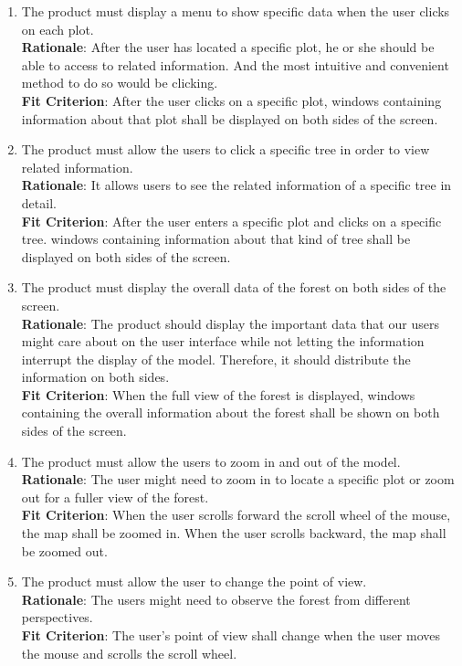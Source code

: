 \documentclass{article}
\begin{document}
\begin{enumerate}[FR1]
	\item The product must display a menu to show specific data when the user clicks on each plot.\\
	\textbf{Rationale}: After the user has located a specific plot, he or she should be able to access to related information. And the most intuitive and convenient method to do so would be clicking. \\
	\textbf{Fit Criterion}: After the user clicks on a specific plot, windows containing information about that plot shall be displayed on both sides of the screen.
	
	\item The product must allow the users to click a specific tree in order to view related information.\\
	\textbf{Rationale}: It allows users to see the related information of a specific tree in detail.\\
	\textbf{Fit Criterion}: After the user enters a specific plot and clicks on a specific tree. windows containing information about that kind of tree shall be displayed on both sides of the screen. 
	
	\item The product must display the overall data of the forest on both sides of the screen.\\
	\textbf{Rationale}: The product should display the important data that our users might care about on the user interface while not letting the information interrupt the display of the model. Therefore, it should distribute the information on both sides.\\
	\textbf{Fit Criterion}: When the full view of the forest is displayed, windows containing the overall information about the forest shall be shown on both sides of the screen. 
	
	\item The product must allow the users to zoom in and out of the model.\\
	\textbf{Rationale}: The user might need to zoom in to locate a specific plot or zoom out for a fuller view of the forest. \\
	\textbf{Fit Criterion}: When the user scrolls forward the scroll wheel of the mouse, the map shall be zoomed in. When the user scrolls backward, the map shall be zoomed out. 
	
	\item The product must allow the user to change the point of view. \\
	\textbf{Rationale}: The users might need to observe the forest from different perspectives.\\
	\textbf{Fit Criterion}: The user's point of view shall change when the user moves the mouse and scrolls the scroll wheel.
	

\end{enumerate}
\end{document}
